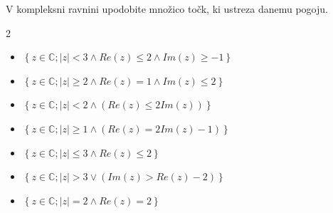             \begin{naloga}
                V kompleksni ravnini upodobite množico točk, ki ustreza danemu pogoju.
                    
                \begin{multicols}{2}
                    
                    \begin{itemize} 
                        \item $\left\{z\in\mathbb{C}; \left|z\right|<3 \land Re(z)\leq 2 \land Im(z)\geq -1 \right\} $ 
                        \item $\left\{z\in\mathbb{C}; \left|z\right|\geq 2 \land Re(z)=1 \land Im(z)\leq 2 \right\} $ 
                        \item $\left\{z\in\mathbb{C}; \left|z\right|< 2 \land \left(Re(z)\leq 2Im(z)\right) \right\} $ 
                        \item $\left\{z\in\mathbb{C}; \left|z\right|\geq 1 \land \left(Re(z)=2Im(z)-1\right) \right\} $ 
                        \item $\left\{z\in\mathbb{C}; \left|z\right|\leq 3 \land Re(z)\leq 2 \right\} $ 
                        \item $\left\{z\in\mathbb{C}; \left|z\right|>3 \lor \left(Im(z)>Re(z)-2\right) \right\} $ 
                        \item $\left\{z\in\mathbb{C}; \left|z\right|=2 \land Re(z)=2 \right\} $ 
                    \end{itemize}
                \end{multicols}
            \end{naloga}



